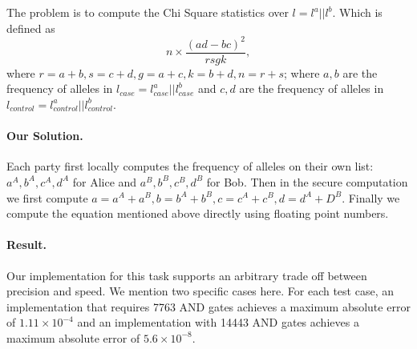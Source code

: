 The problem is to compute the Chi Square statistics over $l = l^a||l^b$. Which is defined as 
$$n\times\frac{(ad-bc)^2}{rsgk},$$
where $r = a + b, s = c + d, g = a + c, k = b + d, n =  r + s$; where $a, b$ are the frequency of alleles in
$l_{case} = l^a_{case} || l^b_{case}$ and $c, d$ are the frequency of alleles in
$l_{control} = l^a_{control} || l^b_{control}$.

\paragraph{Our Solution.}
Each party first locally computes the frequency of alleles on their own list: $a^A,b^A,c^A,d^A$ for Alice
and $a^B,b^B,c^B,d^B$ for Bob. Then in the secure computation we first compute $a = a^A + a^B, b = b^A + b^B,
c = c^A + c^B,d = d^A + D^B$. Finally we compute the equation mentioned above directly using floating point
numbers.

\paragraph{Result.}
Our implementation for this task supports an arbitrary 
trade off between precision and speed. We mention two specific cases here.
For each test case, an implementation that requires 7763 AND gates achieves a maximum absolute error of $1.11\times10^{-4}$
 and an implementation with 14443 AND gates achieves a maximum absolute error of $5.6\times10^{-8}$.

